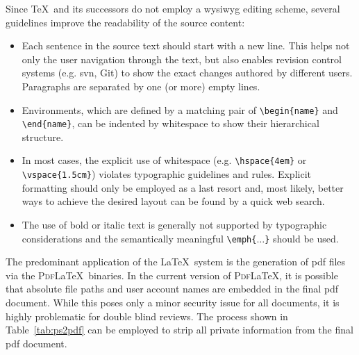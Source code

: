 Since \TeX\ and its successors do not employ a \gls{wysiwyg} editing scheme, several guidelines improve the readability of the source content:
\begin{itemize}
\item Each sentence in the source text should start with a new line.
      This helps not only the user navigation through the text, but also enables revision control systems (e.g. \gls{svn}, Git) to show the exact changes authored by different users.
      Paragraphs are separated by one (or more) empty lines.
\item Environments, which are defined by a matching pair of \verb|\begin{name}| and \verb|\end{name}|, can be indented by whitespace to show their hierarchical structure.
\item In most cases, the explicit use of whitespace (e.g. \verb|\hspace{4em}| or \verb|\vspace{1.5cm}|) violates typographic guidelines and rules.
      Explicit formatting should only be employed as a last resort and, most likely, better ways to achieve the desired layout can be found by a quick web search.
\item The use of bold or italic text is generally not supported by typographic considerations and the semantically meaningful \verb|\emph{|\texttt{$\dots$}\verb|}| should be used.
\end{itemize}

The predominant application of the \LaTeX\ system is the generation of \gls{pdf} files via the \textsc{Pdf}\LaTeX\ binaries.
In the current version of \textsc{Pdf}\LaTeX, it is possible that absolute file paths and user account names are embedded in the final \gls{pdf} document.
While this poses only a minor security issue for all documents, it is highly problematic for double blind reviews.
The process shown in Table~\ref{tab:ps2pdf} can be employed to strip all private information from the final \gls{pdf} document.

